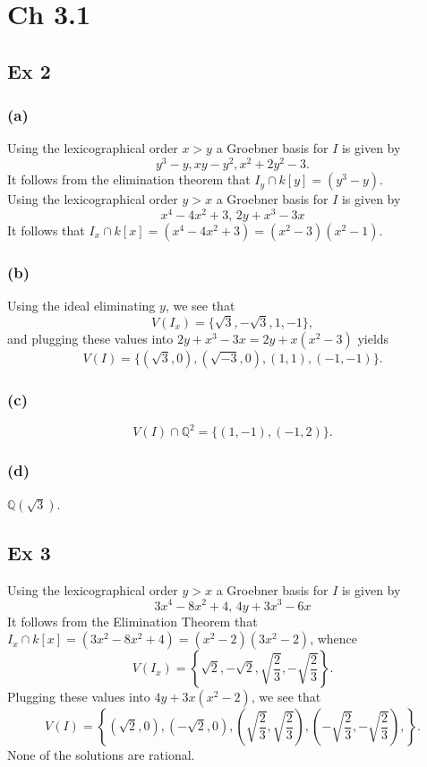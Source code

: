 \documentclass{article}
\theoremstyle{definition}
\newcommand{\Q}{\mathbb{Q}}
\begin{document}
\section*{Ch 3.1}
\subsection*{Ex 2}
\subsubsection*{(a)}

Using the lexicographical order $x > y$ a Groebner basis for $I$
is given by
\[
	y^{3} - y,
	xy - y^{2},
	x^{2} + 2y^{2} - 3.
\] 
It follows from the elimination theorem that $I_y \cap k[y] = (y^3 - y)$. \\

Using the lexicographical order $y > x$ a Groebner basis for $I$
is given by
\[
	x^{4}-4x^{2}+3,\, 
	2y+x^{3}-3x
\] 
It follows that $I_x \cap k[x] = (x^4 - 4x^2 + 3) = (x^2 - 3)(x^2 - 1)$.

\subsubsection*{(b)}

Using the ideal eliminating $y$, we see that 
\[
	V(I_x) = \{
		\sqrt{3}, -\sqrt{3},
		1, -1
	\},
\] 
and plugging these values into $2y + x^3 - 3x = 2y + x(x^2 - 3)$ yields 
\[
	V(I) = \{
		(\sqrt{3}, 0),
		(\sqrt{-3}, 0),
		(1, 1),
		(-1, -1)
	\}.
\] 

\subsubsection*{(c)}
\[
	V(I) \cap \Q^2 = \{
		(1, -1),
		(-1, 2)
	\}.
\] 

\subsubsection*{(d)}
$\Q(\sqrt{3})$.

\subsection*{Ex 3}

Using the lexicographical order $y > x$ a Groebner basis for $I$ is given by
\[
	3x^{4}-8x^{2}+4, \,
	4y+3x^{3}-6x
\] 
It follows from the Elimination Theorem that $I_x \cap k[x] = (3x^2 - 8x^2 + 4) =
(x^2 - 2)(3x^2 - 2)$, whence
\[
	V(I_x) = \left\{
		\sqrt{2},
		-\sqrt{2},
		\sqrt{\frac{2}{3}},
		-\sqrt{\frac{2}{3}}
	\right\}.
\]
Plugging these values into $4y + 3x(x^2 - 2)$, we see that 
\[
	V(I) = \left\{
		(\sqrt{2}, 0),
		(-\sqrt{2}, 0),
		\left(\sqrt{\frac{2}{3}}, \sqrt{\frac{2}{3}}\right),
		\left(-\sqrt{\frac{2}{3}}, -\sqrt{\frac{2}{3}}\right),
	\right\}.
\] 
None of the solutions are rational.
\end{document}
